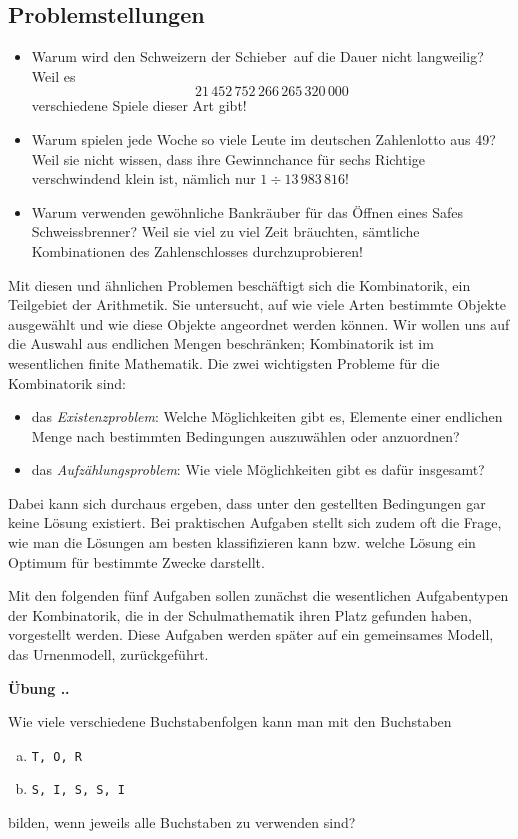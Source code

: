 \documentclass[%
<<<<<<< Updated upstream
<<<<<<< Updated upstream
11pt,%
twoside,%
titlepage,%
german,%
=======
=======
>>>>>>> Stashed changes
11pt,%
twoside,%
titlepage,%
swissgerman,%
<<<<<<< Updated upstream
>>>>>>> Stashed changes
=======
>>>>>>> Stashed changes
headsepline%
]{scrartcl}
\newcommand{\faEyeLightGray}{\textcolor{lightgray}{\faEye}} %
\newcommand{\faEyeLightGray}{\textcolor{lightgray}{\faEye}} %
\newcommand{\definition}[1]{\colorbox{emerald}{#1}}
\theoremstyle{definition}
\theoremstyle{plain}
\newcommand{\concatueb}[1]{ueb:#1}%
\newcommand{\concatlsg}[1]{lsg:#1}%
\newcounter{uebcounter}[section]
\renewcommand{\theuebcounter}{\thesection.\arabic{uebcounter}}  %
\newenvironment{uebenv}[1]{%
    \refstepcounter{uebcounter}
    \par\noindent\textbf{Übung \theuebcounter.}%
    \label{\concatueb{#1}}\hfill\hyperref[\concatlsg{#1}]{\faEyeLightGray}\par
}{%
    \par
}
\newcommand{\concatueb}[1]{ueb:#1}%
\newcommand{\concatlsg}[1]{lsg:#1}%
\newcounter{uebcounter}[section]
\renewcommand{\theuebcounter}{\thesection.\arabic{uebcounter}}  %
\newenvironment{uebenv}[1]{%
    \refstepcounter{uebcounter}
    \par\noindent\textbf{Übung \theuebcounter.}%
    \label{\concatueb{#1}}\hfill\hyperref[\concatlsg{#1}]{\faEyeLightGray}\newline
}{%
    \par
}
\newcommand{\definition}[1]{\colorbox{emerald}{#1}}
\begin{document}
\subsection{Problemstellungen}
\begin{itemize}
\item Warum wird den Schweizern der \glqq Schieber\grqq\ auf die Dauer nicht langweilig? Weil es
$$21\,452\,752\,266\,265\,320\,000$$
verschiedene Spiele dieser Art gibt!
\item Warum spielen jede Woche so viele Leute im deutschen Zahlenlotto  aus 49\grqq?
Weil sie nicht wissen, dass ihre Gewinnchance für sechs Richtige verschwindend klein ist, nämlich nur $1\div13\,983\,816$!
\item Warum verwenden gewöhnliche Bankräuber für das Öffnen eines Safes Schweissbrenner?
Weil sie viel zu viel Zeit bräuchten, sämtliche Kombinationen des Zahlenschlosses durchzuprobieren!
\end{itemize}

Mit diesen und ähnlichen Problemen beschäftigt sich die \definition{Kombinatorik}, ein Teilgebiet der Arithmetik. Sie untersucht, auf wie viele Arten bestimmte Objekte ausgewählt und wie diese Objekte angeordnet werden können. Wir wollen uns auf die Auswahl aus endlichen Mengen beschränken; Kombinatorik ist im wesentlichen finite Mathematik. Die zwei wichtigsten Probleme für die Kombinatorik sind:
\begin{itemize}
\item das \emph{Existenzproblem}: Welche Möglichkeiten gibt es, Elemente einer endlichen Menge nach bestimmten Bedingungen auszuwählen oder anzuordnen?
\item das \emph{Aufzählungsproblem}: Wie viele Möglichkeiten gibt es dafür insgesamt?
\end{itemize}

Dabei kann sich durchaus ergeben, dass unter den gestellten Bedingungen gar keine Lösung existiert. Bei praktischen Aufgaben stellt sich zudem oft die Frage, wie man die Lösungen am besten klassifizieren kann bzw. welche Lösung ein Optimum für bestimmte Zwecke darstellt.

Mit den folgenden fünf Aufgaben sollen zunächst die wesentlichen Aufgabentypen der Kombinatorik, die in der Schulmathematik ihren Platz gefunden haben, vorgestellt werden. Diese Aufgaben werden später auf ein gemeinsames Modell, das Urnenmodell, zurückgeführt.

\begin{uebenv}{torundsissi}
Wie viele verschiedene Buchstabenfolgen kann man mit den Buchstaben
\begin{enumerate}[a)]
\item \texttt{T, O, R}
\item \texttt{S, I, S, S, I}
\end{enumerate}
bilden, wenn jeweils alle Buchstaben zu verwenden sind?
\end{uebenv}
\end{document}
